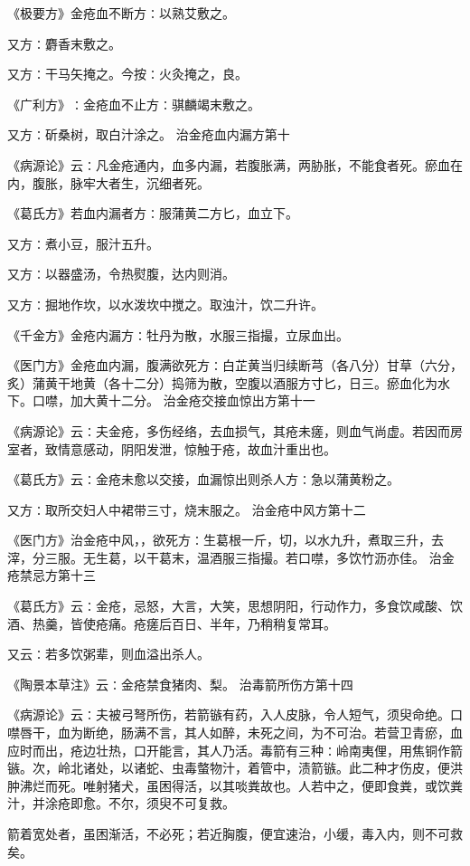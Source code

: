 \documentclass[a4paper,12pt,UTF8,twoside]{ctexbook}
\begin{document}
《极要方》金疮血不断方∶以熟艾敷之。

又方∶麝香末敷之。

又方∶干马矢掩之。今按∶火灸掩之，良。

《广利方》∶金疮血不止方∶骐麟竭末敷之。

又方∶斫桑树，取白汁涂之。
治金疮血内漏方第十

《病源论》云∶凡金疮通内，血多内漏，若腹胀满，两胁胀，不能食者死。瘀血在内，腹胀，脉牢大者生，沉细者死。

《葛氏方》若血内漏者方∶服蒲黄二方匕，血立下。

又方∶煮小豆，服汁五升。

又方∶以器盛汤，令热熨腹，达内则消。

又方∶掘地作坎，以水泼坎中搅之。取浊汁，饮二升许。

《千金方》金疮内漏方∶牡丹为散，水服三指撮，立尿血出。

《医门方》金疮血内漏，腹满欲死方∶白芷黄当归续断芎（各八分）甘草（六分，炙）蒲黄干地黄（各十二分）捣筛为散，空腹以酒服方寸匕，日三。瘀血化为水下。口噤，加大黄十二分。
治金疮交接血惊出方第十一

《病源论》云∶夫金疮，多伤经络，去血损气，其疮未瘥，则血气尚虚。若因而房室者，致情意感动，阴阳发泄，惊触于疮，故血汁重出也。

《葛氏方》云∶金疮未愈以交接，血漏惊出则杀人方∶急以蒲黄粉之。

又方∶取所交妇人中裙带三寸，烧末服之。
治金疮中风方第十二

《医门方》治金疮中风，，欲死方∶生葛根一斤，切，以水九升，煮取三升，去滓，分三服。无生葛，以干葛末，温酒服三指撮。若口噤，多饮竹沥亦佳。
治金疮禁忌方第十三

《葛氏方》云∶金疮，忌怒，大言，大笑，思想阴阳，行动作力，多食饮咸酸、饮酒、热羹，皆使疮痛。疮瘥后百日、半年，乃稍稍复常耳。

又云∶若多饮粥辈，则血溢出杀人。

《陶景本草注》云∶金疮禁食猪肉、梨。
治毒箭所伤方第十四

《病源论》云∶夫被弓弩所伤，若箭镞有药，入人皮脉，令人短气，须臾命绝。口噤唇干，血为断绝，肠满不言，其人如醉，未死之间，为不可治。若营卫青瘀，血应时而出，疮边壮热，口开能言，其人乃活。毒箭有三种∶岭南夷俚，用焦铜作箭镞。次，岭北诸处，以诸蛇、虫毒螫物汁，着管中，渍箭镞。此二种才伤皮，便洪肿沸烂而死。唯射猪犬，虽困得活，以其啖粪故也。人若中之，便即食粪，或饮粪汁，并涂疮即愈。不尔，须臾不可复救。

箭着宽处者，虽困渐活，不必死；若近胸腹，便宜速治，小缓，毒入内，则不可救矣。
\end{document}
